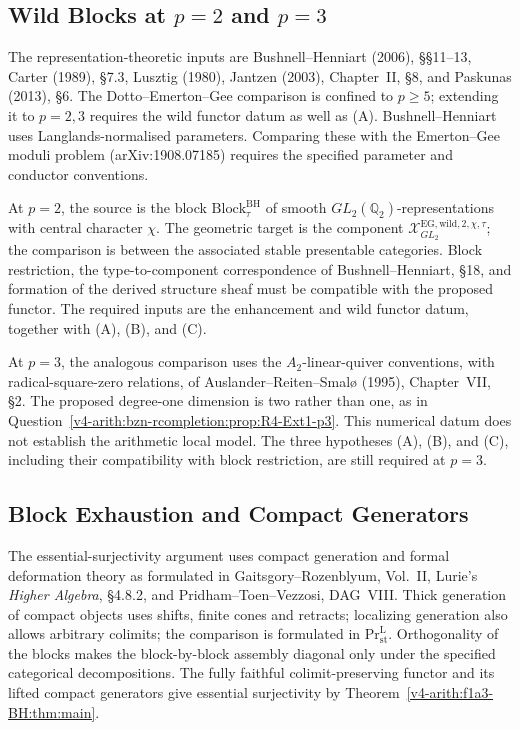 \subsection{Wild Blocks at \(p=2\) and \(p=3\)}

The representation-theoretic inputs are Bushnell--Henniart (2006),
\S\S11--13, Carter (1989), \S7.3, Lusztig (1980), Jantzen (2003),
Chapter~II, \S8, and Paskunas (2013), \S6. The
Dotto--Emerton--Gee comparison is confined to \(p\ge5\); extending
it to \(p=2,3\) requires the wild functor datum as well as (A).
Bushnell--Henniart uses Langlands-normalised parameters. Comparing
these with the Emerton--Gee moduli problem
(arXiv:1908.07185) requires the specified parameter and conductor
conventions.

At \(p=2\), the source is the block
\(\mathrm{Block}^{\mathrm{BH}}_\tau\) of smooth
\(GL_2(\mathbb Q_2)\)-representations with central character \(\chi\).
The geometric target is the component
\(\mathcal X^{\mathrm{EG,wild},2,\chi,\tau}_{GL_2}\); the comparison
is between the associated stable presentable categories.
Block restriction, the type-to-component correspondence of
Bushnell--Henniart, \S18, and formation of the derived structure
sheaf must be compatible with the proposed functor.
The required inputs are the enhancement and wild functor datum,
together with (A), (B), and (C).

At \(p=3\), the analogous comparison uses the
\(A_2\)-linear-quiver conventions, with radical-square-zero relations,
of Auslander--Reiten--Smal{\o} (1995), Chapter~VII, \S2.
The proposed degree-one dimension is two rather than one,
as in Question~\ref{v4-arith:bzn-rcompletion:prop:R4-Ext1-p3}.
This numerical datum does not establish the arithmetic local model.
The three hypotheses (A), (B), and (C), including their compatibility
with block restriction, are still required at \(p=3\).

\subsection{Block Exhaustion and Compact Generators}

The essential-surjectivity argument uses compact generation and
formal deformation theory as formulated in Gaitsgory--Rozenblyum,
Vol.~II, Lurie's \emph{Higher Algebra}, \S4.8.2, and
Pridham--Toen--Vezzosi, DAG~VIII.
Thick generation of compact objects uses shifts, finite cones and
retracts; localizing generation also allows arbitrary colimits; the comparison is formulated in
\(\mathrm{Pr}^{\mathrm L}_{\mathrm{st}}\).
Orthogonality of the blocks makes the block-by-block assembly
diagonal only under the specified categorical decompositions. The
fully faithful colimit-preserving functor and its lifted compact
generators give essential surjectivity by Theorem~\ref{v4-arith:f1a3-BH:thm:main}.

